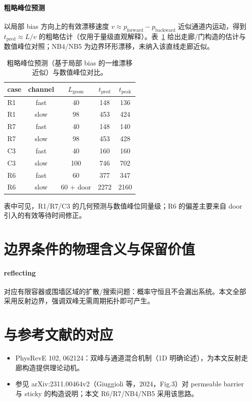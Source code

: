 \documentclass[11pt,fontset=fandol]{ctexart}
\begin{document}
\paragraph{粗略峰位预测}
以局部 bias 方向上的有效漂移速度 $v\approx p_{\text{forward}}-p_{\text{backward}}$ 近似通道内运动，得到 $t_{\text{pred}}\approx L/v$ 的粗略估计（仅用于量级直观解释）。表~\ref{tab:peak-predict} 给出走廊/门构造的估计与数值峰位对照；NB4/NB5 为边界环形漂移，未纳入该直线走廊近似。

\begin{table}[!htbp]
  \centering
  \footnotesize
  \begin{tabular}{lcccc}
    \toprule
    case & channel & $L_{\text{geom}}$ & $t_{\text{pred}}$ & $t_{\text{peak}}$ \\
    \midrule
    R1 & fast & 40 & 148 & 136 \\
    R1 & slow & 98 & 453 & 424 \\
    R7 & fast & 40 & 148 & 140 \\
    R7 & slow & 98 & 453 & 428 \\
    C3 & fast & 40 & 160 & 160 \\
    C3 & slow & 100 & 746 & 702 \\
    R6 & fast & 60 & 377 & 347 \\
    R6 & slow & 60 + door & 2272 & 2160 \\
    \bottomrule
  \end{tabular}
  \caption{粗略峰位预测（基于局部 bias 的一维漂移近似）与数值峰位对比。}
  \label{tab:peak-predict}
\end{table}

\noindent 表中可见，R1/R7/C3 的几何预测与数值峰位同量级；R6 的偏差主要来自 door 引入的有效等待时间修正。


\section{边界条件的物理含义与保留价值}
\paragraph{reflecting} 对应有限容器或围墙区域的扩散/搜索问题：概率守恒且不会漏出系统。本文全部采用反射边界，强调双峰无需周期拓扑即可产生。

\section{与参考文献的对应}
\begin{itemize}
  \item PhysRevE 102, 062124：双峰与通道混合机制（1D 明确论述），为本文反射走廊构造提供理论动机。
  \item 参见 arXiv:2311.00464v2（Giuggioli 等，2024，Fig.3）对 permeable barrier 与 sticky 的构造说明；本文 R6/R7/NB4/NB5 采用该思路。
\end{itemize}
\end{document}
